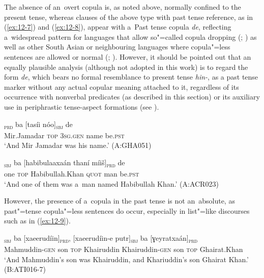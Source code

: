 The absence of an~overt copula is, as noted above, normally confined to the present tense, whereas clauses of the above type with past tense reference, as in (\ref{ex:12-7}) and (\ref{ex:12-8}), appear with a~Past tense copula \textit{de}, reflecting a~widespread pattern for languages that allow so"=called copula dropping (\citealt[34]{pustet2003}; \citealt[120]{givon2001a}) as well as other South Asian or neighbouring languages where copula"=less sentences are allowed or normal (\citealt[339]{masica1991}; \citealt[121]{baart1999a}). However, it should be pointed out that an equally plausible analysis (although not adopted in this work) is to regard the form \textit{de}, which bears no formal resemblance to present tense \textit{hin-}, as a past tense marker without any actual copular meaning attached to it, regardless of its occurrence with nonverbal predicates (as described in this section) or its auxiliary use in periphrastic tense-aspect formations (see ). 

\begin{exe}
\ex
\label{ex:12-7}
\gll [miirǰamadaár]\textsubscript{\textsc{prd}} ba [tasíi nóo]\textsubscript{\textsc{sbj}} de \\
Mir.Jamadar \textsc{top} \textsc{3sg.gen} name be.\textsc{pst} \\
\glt `And Mir Jamadar was his name.' (A:GHA051)
\end{exe}
\begin{exe}
\ex
\label{ex:12-8}
\gll [áa]\textsubscript{\textsc{sbj}} ba [habibulaaxaán thaní míiš]\textsubscript{\textsc{prd}} de \\
one \textsc{top} Habibullah.Khan \textsc{quot} man be.\textsc{pst} \\
\glt `And one of them was a~man named Habibullah Khan.' (A:ACR023)
\end{exe}

However, the presence of a~copula in the past tense is not an~absolute, as past"=tense copula"=less sentences do occur, especially in list"=like discourses such as in (\ref{ex:12-9}).

\begin{exe}
\ex
\label{ex:12-9}
\textsubscript{\textsc{sbj}} ba [xaeerudíin]\textsubscript{\textsc{prd}}, \textsc{[}xaeerudíin-e putr]\textsubscript{\textsc{sbj}} ba [ɣeyratxaán]\textsubscript{\textsc{prd}} \\
Mahmuddin-\textsc{gen} son \textsc{top} Khairuddin Khairuddin-\textsc{gen} son \textsc{top} Ghairat.Khan \\
\glt `And Mahmuddin's son was Khairuddin, and Khariuddin's son Ghairat Khan.' (B:ATI016-7)
\end{exe}

